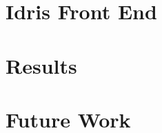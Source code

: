 \documentclass[runningheads]{llncs}
\begin{document}
	\section{Idris Front End} \label{sec:idris-front-end}
	
	
	\section{Results}
	
	
	\newpage
	\section{Future Work}
	
	
	
	
	
	\newpage
	

	
\end{document}
